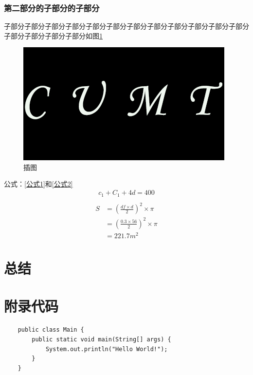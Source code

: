 \documentclass[UTF8,12pt]{ctexart}
\begin{document}
\subsubsection{第二部分的子部分的子部分}
子部分子部分子部分子部分子部分子部分子部分子部分子部分子部分子部分子部分子部分子部分子部分子部分如图\ref{插图1}
\begin{figure}[ht]
    \centering
    \includegraphics{img/cumt.png}
    \caption{插图}
    \label{插图1}
\end{figure}
公式：\eqref{公式1}和\eqref{公式2}
\begin{gather}
    c_1+C_1+4d=400\\
    \label{公式1}
\end{gather}
\begin{align}
    S &= (\frac{df\times d}{2})^2 \times \pi\\
    & = (\frac{0.3 \times 56}{2})^2 \times \pi\\
    & = 221.7m^2
    \label{公式2}
\end{align}
\section{总结}
\newpage
 
 
\newpage
\section*{附录代码}
\lstset{language=java}
\begin{lstlisting}
    public class Main {
        public static void main(String[] args) {
            System.out.println("Hello World!");
        }
    }
\end{lstlisting}
\end{document}
